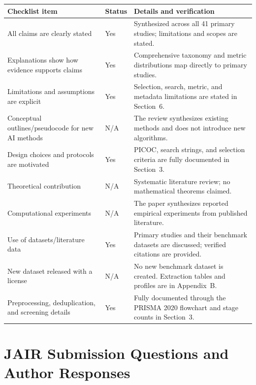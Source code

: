 \IfFileExists{jair.cls}{\documentclass{jair}}{\documentclass[manuscript,nonacm,screen]{acmart}}
\renewcommand{\arraystretch}{1.13}
\begin{document}
\noindent
\begin{minipage}{\textwidth}
\captionsetup{hypcap=false}
\label{tab:repro-checklist}
\centering
\footnotesize
\renewcommand{\arraystretch}{0.92}
\setlength{\tabcolsep}{3pt}
\begin{tabularx}{\textwidth}{p{} p{} X}
\toprule
Checklist item & Status & Details and verification \\
\midrule
All claims are clearly stated & Yes & Synthesized across all 41 primary studies; limitations and scopes are stated. \\
Explanations show how evidence supports claims & Yes & Comprehensive taxonomy and metric distributions map directly to primary studies. \\
Limitations and assumptions are explicit & Yes & Selection, search, metric, and metadata limitations are stated in Section~6. \\
Conceptual outlines/pseudocode for new AI methods & N/A & The review synthesizes existing methods and does not introduce new algorithms. \\
Design choices and protocols are motivated & Yes & PICOC, search strings, and selection criteria are fully documented in Section~3. \\
Theoretical contribution & N/A & Systematic literature review; no mathematical theorems claimed. \\
Computational experiments & N/A & The paper synthesizes reported empirical experiments from published literature. \\
Use of datasets/literature data & Yes & Primary studies and their benchmark datasets are discussed; verified citations are provided. \\
New dataset released with a license & N/A & No new benchmark dataset is created. Extraction tables and profiles are in Appendix~B. \\
Preprocessing, deduplication, and screening details & Yes & Fully documented through the PRISMA 2020 flowchart and stage counts in Section~3. \\
\bottomrule
\end{tabularx}
\end{minipage}

\section{JAIR Submission Questions and Author Responses}
\end{document}
